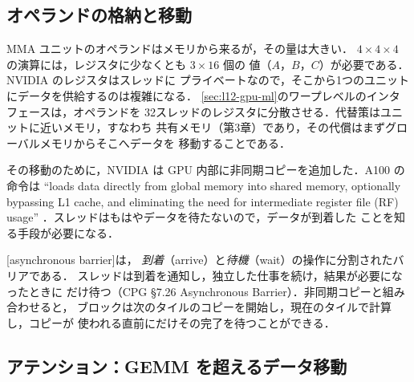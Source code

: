 \documentclass[../main.tex]{subfiles}
\begin{document}
\subsection{オペランドの格納と移動}

MMA ユニットのオペランドはメモリから来るが，その量は大きい．
$4 \times 4 \times 4$ の演算には，レジスタに少なくとも $3 \times 16$ 個の
値（$A$，$B$，$C$）が必要である．NVIDIA のレジスタはスレッドに
プライベートなので，そこから1つのユニットにデータを供給するのは複雑になる．
\cref{sec:l12-gpu-ml}のワープレベルのインタフェースは，オペランドを
32スレッドのレジスタに分散させる．代替策はユニットに近いメモリ，すなわち
共有メモリ（第3章）であり，その代償はまずグローバルメモリからそこへデータを
移動することである．

その移動のために，NVIDIA は GPU 内部に非同期コピーを追加した．A100 の命令は
\enquote{loads data directly from global memory into shared memory,
optionally bypassing L1 cache, and eliminating the need for intermediate
register file (RF) usage}
\cite{nvidia2020ampere}．スレッドはもはやデータを待たないので，データが到着した
ことを知る手段が必要になる．

\begin{definition}[非同期バリア]
  [asynchronous barrier]は，
  \emph{到着}（arrive）と\emph{待機}（wait）の操作に分割されたバリアである．
  スレッドは到着を通知し，独立した仕事を続け，結果が必要になったときに
  だけ待つ（CPG §7.26 Asynchronous Barrier）．非同期コピーと組み合わせると，
  ブロックは次のタイルのコピーを開始し，現在のタイルで計算し，コピーが
  使われる直前にだけその完了を待つことができる．
\end{definition}

\subsection{アテンション：GEMM を超えるデータ移動}
\end{document}
